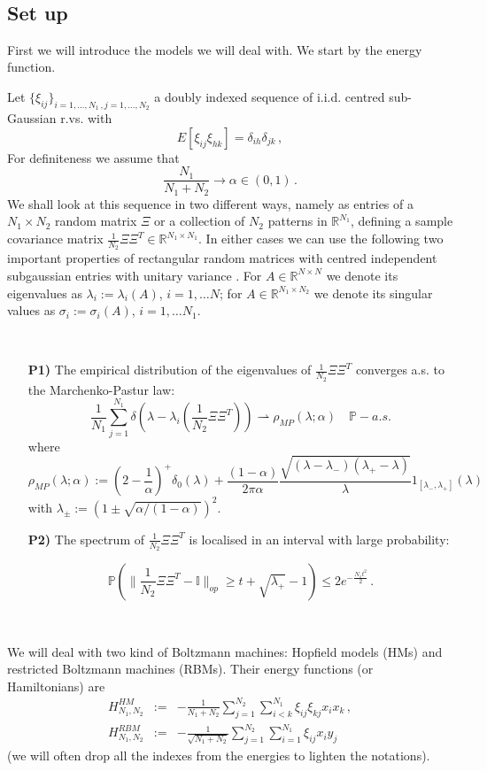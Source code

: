 \documentclass[10pt,oneside,a4paper,reqno]{amsart}  %
\def\P{\mathbb P}
\def\be{\begin{equation}}
\def\ee{\end{equation}}
\def\bea{\begin{eqnarray}}
\def\eea{\end{eqnarray}}
\def\a{\alpha}
\def\d{\delta}
\def\l{\lambda}
\def\r{\rho}
\def\s{\sigma}
\def\R{\mathbb{R}}
\theoremstyle{plain}
\numberwithin{equation}{section}
\begin{document}
\

\subsection{Set up}

First we will introduce the models we will deal with. We start by the energy function.

Let $\{\xi_{ij}\}_{i=1,\ldots,N_1\,,j=1,\ldots,N_2}$ a doubly indexed sequence of i.i.d. centred sub-Gaussian r.vs. with 
$$
E[\xi_{ij}\xi_{hk}]=\d_{ih}\d_{jk}\,, 
$$
For definiteness we  assume that
$$
\frac{N_1}{N_1+N_2}\to \a\in(0,1)\,.
$$
We shall look at this sequence in two different ways, namely as entries of a $N_1\times N_2$ random matrix $\Xi$ or a collection of $N_2$ patterns in $\R^{N_1}$, defining a sample covariance matrix  $\frac{1}{N_2}\Xi\Xi^T\in\R^{N_1\times N_1}$. In either cases we can use the following two important properties of rectangular random matrices with centred independent subgaussian entries with unitary variance \cite{bai,versh}. For $A\in\R^{N\times N}$ we denote its eigenvalues as $\l_i:=\l_{i}(A)$, $i=1,\ldots N$; for $A\in\R^{N_1\times N_2}$ we denote its singular values as $\s_i:=\s_{i}(A)$, $i=1,\ldots N_1$.

\

\begin{itemize}
\item[\bf P1)] The empirical distribution of the eigenvalues of $\frac{1}{N_2}\Xi\Xi^T$ converges a.s. to the Marchenko-Pastur law:
$$
\frac{1}{N_1}\sum_{j=1}^{N_1}\d(\l-\l_i(\frac{1}{N_2}\Xi\Xi^T)) \rightharpoonup \r_{MP}(\l;\a)\quad \P-a.s.
$$
where%
\be\label{eq:MP}
\r_{MP}(\l;\a):= (2-\frac{1}{\a})^+\d_0(\l) +\frac{(1-\alpha)}{2\pi \alpha}\frac{\sqrt{(\l-\l_-)(\l_+-\l)}}{\l}1_{[\l_-,\l_+]}(\l)
\ee
with  $\l_{\pm}:=\left(1\pm\sqrt{\a/(1-\a)}\right)^2$. 

\item[\bf P2)] The spectrum of $\frac{1}{N_2}\Xi\Xi^T$ is localised in an interval with large probability:

\be\label{eq:impo-spectrum}
\P(\|\frac {1}{N_2}\Xi\Xi^T-\mathbb I\|_{op}\geq t+\sqrt{\l_+}-1)\leq 2e^{-\frac {N_1t^2}{2}}\,. 
\ee
\end{itemize}

\

We will deal with two kind of Boltzmann machines: Hopfield models (HMs) and restricted Boltzmann machines (RBMs). Their energy functions (or Hamiltonians) are 
\bea
H_{N_1,N_2}^{HM}&:=&-\frac{1}{N_1+N_2}\sum_{j=1}^{N_2}\sum_{i<k}^{N_1} \xi_{ij}\xi_{kj}x_ix_k%
\,,\label{eq:HM}\\
H_{N_1,N_2}^{RBM}&:=&-\frac{1}{\sqrt{N_1+N_2}}\sum_{j=1}^{N_2}\sum_{i=1}^{N_1} \xi_{ij}x_iy_j\,\label{eq:RBM}
\eea
(we will often drop all the indexes from the energies to lighten the notations).
\end{document}
